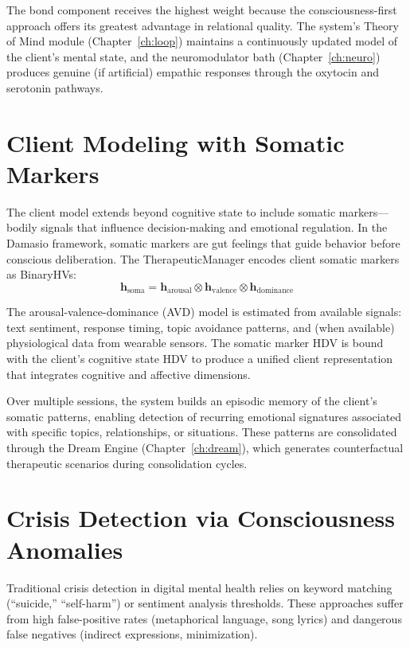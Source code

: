\documentclass[12pt]{book}
\newcommand{\bind}{\otimes}
\begin{document}
The bond component receives the highest weight because the consciousness-first approach offers its greatest advantage in relational quality. The system's Theory of Mind module (Chapter~\ref{ch:loop}) maintains a continuously updated model of the client's mental state, and the neuromodulator bath (Chapter~\ref{ch:neuro}) produces genuine (if artificial) empathic responses through the oxytocin and serotonin pathways.

\section{Client Modeling with Somatic Markers}

The client model extends beyond cognitive state to include somatic markers---bodily signals that influence decision-making and emotional regulation. In the Damasio framework, somatic markers are gut feelings that guide behavior before conscious deliberation. The TherapeuticManager encodes client somatic markers as BinaryHVs:
\begin{equation}
\mathbf{h}_{\text{soma}} = \mathbf{h}_{\text{arousal}} \bind \mathbf{h}_{\text{valence}} \bind \mathbf{h}_{\text{dominance}}
\end{equation}

The arousal-valence-dominance (AVD) model is estimated from available signals: text sentiment, response timing, topic avoidance patterns, and (when available) physiological data from wearable sensors. The somatic marker HDV is bound with the client's cognitive state HDV to produce a unified client representation that integrates cognitive and affective dimensions.

Over multiple sessions, the system builds an episodic memory of the client's somatic patterns, enabling detection of recurring emotional signatures associated with specific topics, relationships, or situations. These patterns are consolidated through the Dream Engine (Chapter~\ref{ch:dream}), which generates counterfactual therapeutic scenarios during consolidation cycles.

\section{Crisis Detection via Consciousness Anomalies}

Traditional crisis detection in digital mental health relies on keyword matching (``suicide,'' ``self-harm'') or sentiment analysis thresholds. These approaches suffer from high false-positive rates (metaphorical language, song lyrics) and dangerous false negatives (indirect expressions, minimization).
\end{document}
